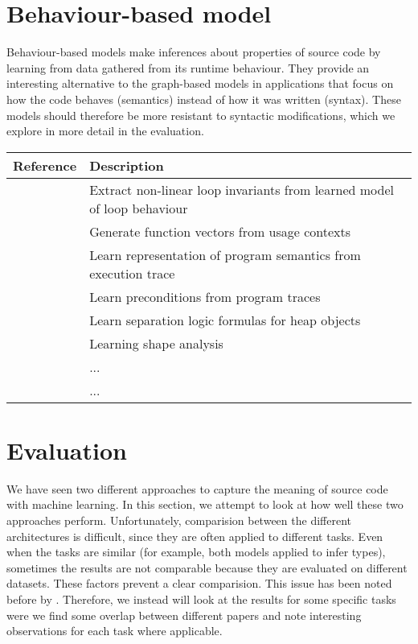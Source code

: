\documentclass[sigconf,authordraft=true,nonacm=true]{acmart}
\begin{document}
\section{Behaviour-based model}
Behaviour-based models make inferences about properties of source code by learning from data gathered from its runtime behaviour.
They provide an interesting alternative to the graph-based models in applications that focus on how the code behaves (semantics) instead of how it was written (syntax).
These models should therefore be more resistant to syntactic modifications, which we explore in more detail in the evaluation.

\begin{table*}[t]
  \begin{tabularx}{\textwidth}{lX}
    \toprule
    Reference & Description \\
    \midrule
    \citet{yao_learning_2020} & Extract non-linear loop invariants from learned model of loop behaviour \\
    \citet{henkel_code_2018} & Generate function vectors from usage contexts \\
    \citet{wang_learning_2019} & Learn representation of program semantics from execution trace \\
    \citet{padhi_data-driven_2016} & Learn preconditions from program traces \\
    \citet{li_gated_2017} & Learn separation logic formulas for heap objects \\
    \citet{brockschmidt_learning_2017} & Learning shape analysis \\
    \citet{piech_learning_2015} & ... \\
    \citet{paasen_execution_2016} & ... \\
    \bottomrule
  \end{tabularx}
\end{table*}

\section{Evaluation}\label{sec:eval}

We have seen two different approaches to capture the meaning of source code with machine learning.
In this section, we attempt to look at how well these two approaches perform.
Unfortunately, comparision between the different architectures is difficult, since they are often applied to different tasks.
Even when the tasks are similar (for example, both models applied to infer types), sometimes the results are not comparable because they are evaluated on different datasets.
These factors prevent a clear comparision.
This issue has been noted before by \citet[p. 71]{bourgeois_learning_2019}.
Therefore, we instead will look at the results for some specific tasks were we find some overlap between different papers and note interesting observations for each task where applicable.
\end{document}
